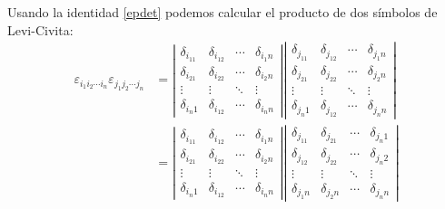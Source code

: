 Usando la identidad \eqref{epdet} podemos calcular el producto de dos símbolos de Levi-Civita:
\begin{align}
\varepsilon_{i_1i_2\cdots i_n}\varepsilon_{j_1j_2\cdots j_n} &=  \left|\begin{array}{cccc}
\delta_{i_11} & \delta_{i_12} & \cdots & \delta_{i_1n} \\ 
\delta_{i_21} & \delta_{i_22} & \cdots & \delta_{i_2n} \\ 
\vdots & \vdots & \ddots & \vdots \\ 
\delta_{i_n1} & \delta_{i_12} & \cdots & \delta_{i_nn}
\end{array} \right|   \left|\begin{array}{cccc}
\delta_{j_11} & \delta_{j_12} & \cdots & \delta_{j_1n} \\ 
\delta_{j_21} & \delta_{j_22} & \cdots & \delta_{j_2n} \\ 
\vdots & \vdots & \ddots & \vdots \\ 
\delta_{j_n1} & \delta_{j_12} & \cdots & \delta_{j_nn}
\end{array} \right| \\
&=   \left|\begin{array}{cccc}
\delta_{i_11} & \delta_{i_12} & \cdots & \delta_{i_1n} \\ 
\delta_{i_21} & \delta_{i_22} & \cdots & \delta_{i_2n} \\ 
\vdots & \vdots & \ddots & \vdots \\ 
\delta_{i_n1} & \delta_{i_12} & \cdots & \delta_{i_nn}
\end{array} \right|   \left|\begin{array}{cccc}
\delta_{j_11} & \delta_{j_21} & \cdots & \delta_{j_n1} \\ 
\delta_{j_12} & \delta_{j_22} & \cdots & \delta_{j_n2} \\ 
\vdots & \vdots & \ddots & \vdots \\ 
\delta_{j_1n} & \delta_{j_2n} & \cdots & \delta_{j_nn}
\end{array} \right| \label{truco}\\

\end{align}
